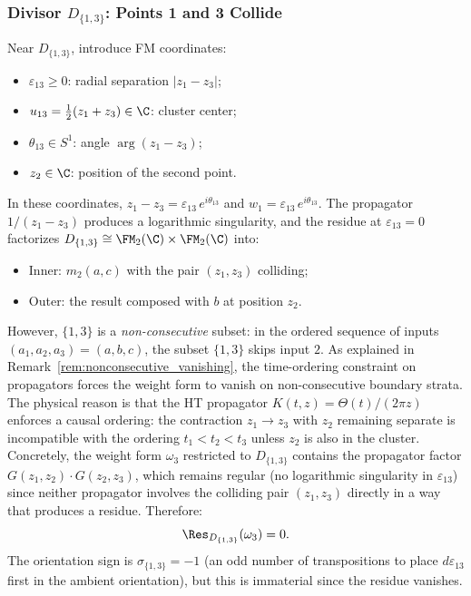 \subsubsection{Divisor $D_{\{1,3\}}$: Points 1 and 3 Collide}

\begin{computation}[$D_{\{1,3\}}$ residue]
\label{comp:D13}
Near $D_{\{1,3\}}$, introduce FM coordinates:
\begin{itemize}
\item $\varepsilon_{13} \geq 0$: radial separation $|z_1 - z_3|$;
\item $u_{13} = \tfrac{1}{2}(z_1 + z_3) \in \C$: cluster center;
\item $\theta_{13} \in S^1$: angle $\arg(z_1 - z_3)$;
\item $z_2 \in \C$: position of the second point.
\end{itemize}
In these coordinates, $z_1 - z_3 = \varepsilon_{13}\, e^{i\theta_{13}}$ and $w_1 = \varepsilon_{13}\, e^{i\theta_{13}}$. The propagator $1/(z_1 - z_3)$ produces a logarithmic singularity, and the residue at $\varepsilon_{13} = 0$ factorizes $D_{\{1,3\}} \cong \FM_2(\C) \times \FM_2(\C)$ into:
\begin{itemize}
\item Inner: $m_2(a, c)$ with the pair $(z_1, z_3)$ colliding;
\item Outer: the result composed with $b$ at position $z_2$.
\end{itemize}
However, $\{1,3\}$ is a \emph{non-consecutive} subset: in the ordered sequence of inputs $(a_1, a_2, a_3) = (a, b, c)$, the subset $\{1,3\}$ skips input $2$. As explained in Remark~\ref{rem:nonconsecutive_vanishing}, the time-ordering constraint on propagators forces the weight form to vanish on non-consecutive boundary strata. The physical reason is that the HT propagator $K(t,z) = \Theta(t)/(2\pi z)$ enforces a causal ordering: the contraction $z_1 \to z_3$ with $z_2$ remaining separate is incompatible with the ordering $t_1 < t_2 < t_3$ unless $z_2$ is also in the cluster. Concretely, the weight form $\omega_3$ restricted to $D_{\{1,3\}}$ contains the propagator factor $G(z_1, z_2) \cdot G(z_2, z_3)$, which remains regular (no logarithmic singularity in $\varepsilon_{13}$) since neither propagator involves the colliding pair $(z_1, z_3)$ directly in a way that produces a residue. Therefore:
\[
\Res_{D_{\{1,3\}}}(\omega_3) = 0.
\]
The orientation sign is $\sigma_{\{1,3\}} = -1$ (an odd number of transpositions to place $d\varepsilon_{13}$ first in the ambient orientation), but this is immaterial since the residue vanishes.
\end{computation}

